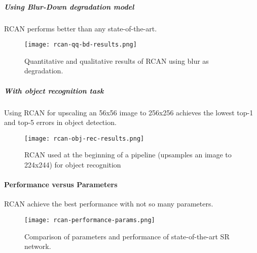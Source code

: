 \subparagraph{Using Blur-Down degradation model}
RCAN performs better than any state-of-the-art.
\begin{figure}[H]
    \centering
    \texttt{[image: rcan-qq-bd-results.png]}
    \caption{Quantitative and qualitative results of RCAN using blur as degradation.}
\end{figure}

\subparagraph{With object recognition task}
Using RCAN for upscaling an 56x56 image to 256x256 achieves the lowest top-1 and top-5 errors in object detection.
\begin{figure}[H]
    \centering
    \texttt{[image: rcan-obj-rec-results.png]}
    \caption{RCAN used at the beginning of a pipeline (upsamples an image to 224x244) for object recognition}
\end{figure}

\paragraph{Performance versus Parameters}
RCAN achieve the best performance with not so many parameters.
\begin{figure}[H]
    \centering
    \texttt{[image: rcan-performance-params.png]}
    \caption{Comparison of parameters and performance of state-of-the-art SR network.}
\end{figure}